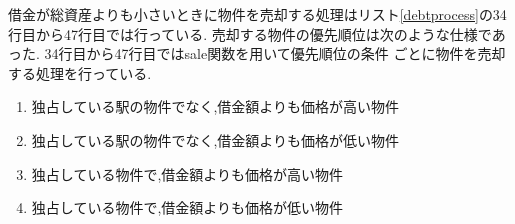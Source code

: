 \documentclass[a4j]{jarticle}
\begin{document}
        借金が総資産よりも小さいときに物件を売却する処理はリスト\ref{debtprocess}の34行目から47行目では行っている.
        売却する物件の優先順位は次のような仕様であった. 34行目から47行目ではsale関数を用いて優先順位の条件
        ごとに物件を売却する処理を行っている.
        \begin{enumerate}
            \item 独占している駅の物件でなく,借金額よりも価格が高い物件
            \item 独占している駅の物件でなく,借金額よりも価格が低い物件
            \item 独占している物件で,借金額よりも価格が高い物件
            \item 独占している物件で,借金額よりも価格が低い物件
        \end{enumerate}
\end{document}
